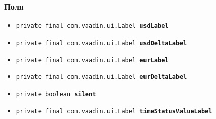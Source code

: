 \documentclass{article}
\begin{document}
{{{{{{{{{{\subsubsection*{Поля}{
\begin{itemize}
\item{
\label{com.xotonic.dashboard.ui.CurrencyUpdater.usdLabel}\texttt{private final com.vaadin.ui.Label\ {\bf  usdLabel}}
}
\item{
\label{com.xotonic.dashboard.ui.CurrencyUpdater.usdDeltaLabel}\texttt{private final com.vaadin.ui.Label\ {\bf  usdDeltaLabel}}
}
\item{
\label{com.xotonic.dashboard.ui.CurrencyUpdater.eurLabel}\texttt{private final com.vaadin.ui.Label\ {\bf  eurLabel}}
}
\item{
\label{com.xotonic.dashboard.ui.CurrencyUpdater.eurDeltaLabel}\texttt{private final com.vaadin.ui.Label\ {\bf  eurDeltaLabel}}
}
\item{
\label{com.xotonic.dashboard.ui.CurrencyUpdater.silent}\texttt{private boolean\ {\bf  silent}}
}
\item{
\label{com.xotonic.dashboard.ui.CurrencyUpdater.timeStatusValueLabel}\texttt{private final com.vaadin.ui.Label\ {\bf  timeStatusValueLabel}}
\begin{itemize}
\item{\vskip -.9ex 
}
\end{itemize}}
\end{itemize}}}}}}}}}}}}
\end{document}
